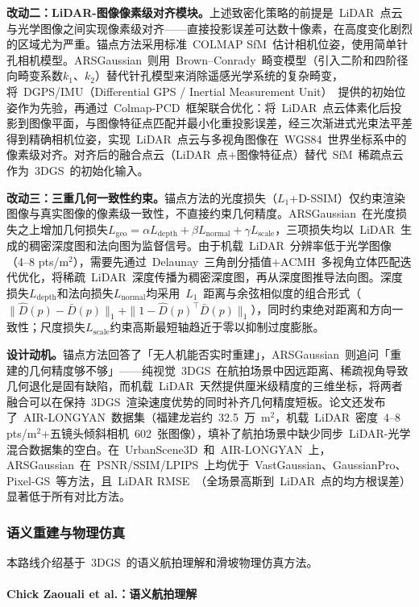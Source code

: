\textbf{改动二：LiDAR-图像像素级对齐模块。}上述致密化策略的前提是~LiDAR~点云与光学图像之间实现像素级对齐——直接投影误差可达数十像素，在高度变化剧烈的区域尤为严重。锚点方法采用标准~COLMAP SfM~估计相机位姿，使用简单针孔相机模型。ARSGaussian~则用~Brown--Conrady~畸变模型（引入二阶和四阶径向畸变系数$k_1$、$k_2$）替代针孔模型来消除遥感光学系统的复杂畸变，将~DGPS/IMU（Differential GPS / Inertial Measurement Unit）~提供的初始位姿作为先验，再通过~Colmap-PCD~框架联合优化：将~LiDAR~点云体素化后投影到图像平面，与图像特征点匹配并最小化重投影误差，经三次渐进式光束法平差得到精确相机位姿，实现~LiDAR~点云与多视角图像在~WGS84~世界坐标系中的像素级对齐。对齐后的融合点云（LiDAR~点+图像特征点）替代~SfM~稀疏点云作为~3DGS~的初始化输入。

\textbf{改动三：三重几何一致性约束。}锚点方法的光度损失（$L_1$+D-SSIM）仅约束渲染图像与真实图像的像素级一致性，不直接约束几何精度。ARSGaussian~在光度损失之上增加几何损失$L_{\text{geo}} = \alpha L_{\text{depth}} + \beta L_{\text{normal}} + \gamma L_{\text{scale}}$，三项损失均以~LiDAR~生成的稠密深度图和法向图为监督信号。由于机载~LiDAR~分辨率低于光学图像（4--8 pts/m$^2$），需要先通过~Delaunay~三角剖分插值+ACMH~多视角立体匹配迭代优化，将稀疏~LiDAR~深度传播为稠密深度图，再从深度图推导法向图。深度损失$L_{\text{depth}}$和法向损失$L_{\text{normal}}$均采用~$L_1$~距离与余弦相似度的组合形式（$\|\hat{D}(p) - \bar{D}(p)\|_1 + \|1 - \hat{D}(p)^\top \bar{D}(p)\|_1$），同时约束绝对距离和方向一致性；尺度损失$L_{\text{scale}}$约束高斯最短轴趋近于零以抑制过度膨胀。

\textbf{设计动机。}锚点方法回答了「无人机能否实时重建」，ARSGaussian~则追问「重建的几何精度够不够」——纯视觉~3DGS~在航拍场景中因远距离、稀疏视角导致几何退化是固有缺陷，而机载~LiDAR~天然提供厘米级精度的三维坐标，将两者融合可以在保持~3DGS~渲染速度优势的同时补齐几何精度短板。论文还发布了~AIR-LONGYAN~数据集（福建龙岩约~32.5~万~m$^2$，机载~LiDAR~密度~4--8 pts/m$^2$+五镜头倾斜相机~602~张图像），填补了航拍场景中缺少同步~LiDAR-光学混合数据集的空白。在~UrbanScene3D~和~AIR-LONGYAN~上，ARSGaussian~在~PSNR/SSIM/LPIPS~上均优于~VastGaussian、GaussianPro、Pixel-GS~等方法，且~LiDAR RMSE~（全场景高斯到~LiDAR~点的均方根误差）显著低于所有对比方法。

\subsubsection{语义重建与物理仿真}

本路线介绍基于~3DGS~的语义航拍理解和滑坡物理仿真方法。

\paragraph{Chick Zaouali et al.：语义航拍理解}

